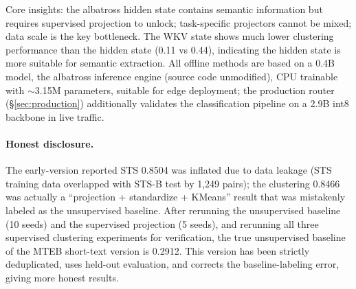 \documentclass[11pt]{article}
\begin{document}
Core insights: the albatross hidden state contains semantic information but
requires supervised projection to unlock; task-specific projectors cannot
be mixed; data scale is the key bottleneck. The WKV state shows much lower
clustering performance than the hidden state (0.11 vs 0.44), indicating the
hidden state is more suitable for semantic extraction. All offline methods
are based on a 0.4B model, the albatross inference engine (source code
unmodified), CPU trainable with $\sim$3.15M parameters, suitable for edge
deployment; the production router (\S\ref{sec:production}) additionally
validates the classification pipeline on a 2.9B int8 backbone in live
traffic.

\paragraph{Honest disclosure.} The early-version reported STS 0.8504 was
inflated due to data leakage (STS training data overlapped with STS-B test
by 1,249 pairs); the clustering 0.8466 was actually a ``projection +
standardize + KMeans'' result that was mistakenly labeled as the
unsupervised baseline. After rerunning the unsupervised baseline (10 seeds)
and the supervised projection (5 seeds), and rerunning all three supervised
clustering experiments for verification, the true unsupervised baseline of
the MTEB short-text version is 0.2912. This version has been strictly
deduplicated, uses held-out evaluation, and corrects the baseline-labeling
error, giving more honest results.
\end{document}
